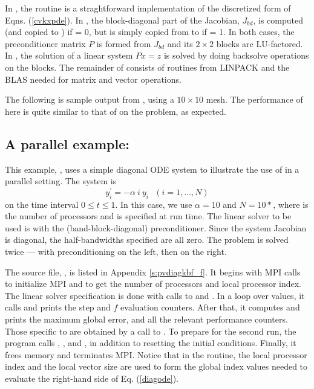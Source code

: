 In , the  routine is a straghtforward implementation
of the discretized form of Eqns. (\ref{cvkxpde}).  In , the
block-diagonal part of the Jacobian, $J_{bd}$, is computed (and copied to
) if  = 0, but is simply copied from  to  if
 = 1.  In both cases, the preconditioner matrix $P$ is formed from 
$J_{bd}$ and its $2 \times 2$ blocks are LU-factored.  In ,
the solution of a linear system $Px = z$ is solved by doing backsolve
operations on the blocks.  The remainder of  consists of
routines from LINPACK and the BLAS needed for matrix and vector operations.

The following is sample output from , using a $10 \times 10$ mesh.
The performance of {\fcvode} here is quite similar to that of {\cvode} on
the  problem, as expected.



\subsection{A parallel example: }\label{ss:pvdiagkbf}

This example, , uses a simple diagonal ODE system to illustrate
the use of {\fcvode} in a parallel setting.  The system is
\begin{equation} \label{diagode}
y^\prime_i = - \alpha ~i~ y_i ~~~ (i = 1,\ldots, N)
\end{equation}
on the time interval $0 \leq t \leq 1$.  In this case, we use $\alpha = 10$
and $N = 10*$, where  is the number of processors
and is specified at run time.  The linear solver to be used is
{\spgmr} with the {\cvbbdpre} (band-block-diagonal) preconditioner.
Since the system Jacobian is diagonal, the half-bandwidths specified
are all zero.  The problem is solved twice --- with preconditioning on
the left, then on the right.

The source file, , is listed in Appendix \ref{s:pvdiagkbf_f}.
It begins with MPI calls to initialize MPI and to get the number of processors
and local processor index.  The linear solver specification is done with
calls to  and .  In a loop over 
values, it calls  and prints the step and $f$ evaluation counters.
After that, it computes and prints the maximum global error, and all the
relevant performance counters.  Those specific to {\cvbbdpre} are obtained
by a call to .  To prepare for the second run, the program
calls , , and , in addition
to resetting the initial conditions.  Finally, it frees memory and terminates MPI.
Notice that in the  routine, the local processor index 
and the local vector size  are used to form the global index
values needed to evaluate the right-hand side of Eq. (\ref{diagode}).

